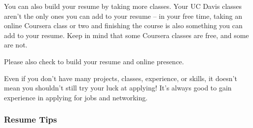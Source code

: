 \documentclass{article}
\begin{document}
You can also build your resume by taking more classes. Your UC Davis classes
aren't the only ones you can add to your resume -- in your free time, taking an
online Coursera class or two and finishing the course is also something you can
add to your resume. Keep in mind that some Coursera classes are free, and some
are not.

Please also check  to build your resume and online
presence.

Even if you don't have many projects, classes, experience, or skills, it doesn't
mean you shouldn't still try your luck at applying! It's always good to gain
experience in applying for jobs and networking.
\subsubsection{Resume Tips}
\end{document}
